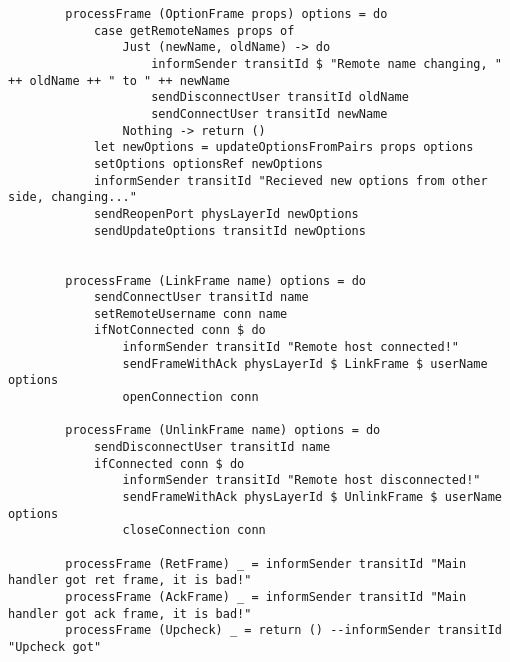\documentclass[russian,utf8,simple,emptystyle]{eskdtext}
\begin{document}
\begin{lstlisting}
        processFrame (OptionFrame props) options = do 
            case getRemoteNames props of 
                Just (newName, oldName) -> do 
                    informSender transitId $ "Remote name changing, " ++ oldName ++ " to " ++ newName
                    sendDisconnectUser transitId oldName
                    sendConnectUser transitId newName
                Nothing -> return ()
            let newOptions = updateOptionsFromPairs props options
            setOptions optionsRef newOptions
            informSender transitId "Recieved new options from other side, changing..."
            sendReopenPort physLayerId newOptions
            sendUpdateOptions transitId newOptions


        processFrame (LinkFrame name) options = do 
            sendConnectUser transitId name
            setRemoteUsername conn name
            ifNotConnected conn $ do 
                informSender transitId "Remote host connected!"
                sendFrameWithAck physLayerId $ LinkFrame $ userName options
                openConnection conn  

        processFrame (UnlinkFrame name) options = do 
            sendDisconnectUser transitId name
            ifConnected conn $ do 
                informSender transitId "Remote host disconnected!"
                sendFrameWithAck physLayerId $ UnlinkFrame $ userName options
                closeConnection conn 

        processFrame (RetFrame) _ = informSender transitId "Main handler got ret frame, it is bad!"
        processFrame (AckFrame) _ = informSender transitId "Main handler got ack frame, it is bad!"
        processFrame (Upcheck) _ = return () --informSender transitId "Upcheck got"
\end{lstlisting}
\end{document}
